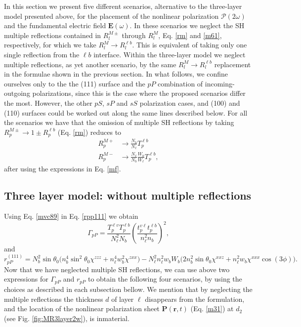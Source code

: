 In this section we present five different scenarios, alternative to the three-layer model presented above, for the placement of the nonlinear polarization $\boldsymbol{\mathcal{P}}(2\omega)$ and the fundamental electric field $\mathbf{E}(\omega)$. In these scenarios we neglect the SH multiple reflections contained in $R^{M\pm}_{l}$ through $R^{M}_{l}$, Eq. \eqref{rm} and \eqref{m61}, respectively, for which we take $R^{M}_{l}\to R^{\ell b}_{l}$. This is equivalent of taking only one single reflection from the $\ell b$ interface. Within the three-layer model we neglect multiple reflections, as yet another scenario, by the same $R^{M}_{l}\to R^{\ell b}_{l}$ replacement in the formulae shown in the previous section. In what follows, we confine ourselves only to the the (111) surface and the $pP$ combination of incoming-outgoing polarizations, since this is the case where the proposed scenarios differ the most. However, the other $pS$, $sP$ and $sS$ polarization cases, and (100) and (110) surfaces could be worked out along the same lines described below. For all the scenarios we have that the omission of multiple SH reflections by taking $R^{M\pm}_{p}\to 1\pm R^{\ell b}_{p}$ (Eq. \eqref{rm}) reduces to
\begin{align}\label{mvc89}
R^{M+}_{p}&\to\frac{N_{b}}{N_{\ell}}T^{\ell b}_{p}\nonumber\\
R^{M-}_{p}&\to\frac{N_{\ell}}{N_{b}}\frac{W_{b}}{W_{\ell}}T^{\ell b}_{p},
\end{align}
after using the expressions in Eq. \eqref{mf}.



\subsection{Three layer model: without multiple reflections}\label{sec:nomr}

Using Eq. \eqref{mvc89} in Eq. \eqref{rpp111} we obtain
\begin{equation}\label{m79}
\Gamma_{pP}=
\frac{T_{p}^{\ell v}T^{\ell b}_{p}}
     {N^{2}_{\ell}N_{b}}
\left(
\frac{t_{p}^{v\ell}t^{\ell b}_{p}}
     {n^{2}_{\ell}n_{b}}
\right)^{2},  
\end{equation}
and
\begin{equation}\label{m81}
r^{(111)}_{pP} =
N^{2}_{b}\sin\theta_{0}
\Big(
  n^{4}_{b}\sin^{2}\theta_{0}\chi^{zzz}
+ n^{4}_{\ell}w^2_{b}\chi^{zxx}
\Big)
- N^{2}_{\ell}n^{2}_{\ell}w_{b}W_{b}
\Big(
  2n^{2}_{b}\sin\theta_{0}\chi^{xxz}
+ n^{2}_{\ell}w_{b}\chi^{xxx}\cos(3\phi) 
\Big).
\end{equation}
Now that we have neglected multiple SH reflections, we can use above two expressions for $\Gamma_{pP}$ and $r_{pP}$ to obtain the following four scenarios, by using the choices as described in each subsection bellow. We mention that by neglecting the multiple reflections the thickness $d$ of layer $\ell$ disappears from the formulation, and the location of the nonlinear polarization sheet $\mathbf{P}(\mathbf{r},t)$ (Eq. \eqref{m31}) at $d_{2}$ (see Fig. \ref{fig:MR3layer2w}), is inmaterial.

